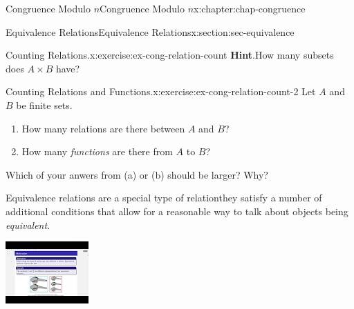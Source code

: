\documentclass[oneside,10pt,]{book}
\newcommand{\blocktitlefont}{\relax}
\numberwithin{equation}{section}
\newlength{\qrsize}
\newlength{\previewwidth}
\begin{document}
\begin{chapterptx}{Congruence Modulo \(n\)}{}{Congruence Modulo \(n\)}{}{}{x:chapter:chap-congruence}
\begin{sectionptx}{Equivalence Relations}{}{Equivalence Relations}{}{}{x:section:sec-equivalence}
\begin{inlineexercise}{Counting Relations.}{x:exercise:ex-cong-relation-count}
\noindent\textbf{\blocktitlefont Hint}.\hypertarget{g:hint:id532434}{}\quad{}How many subsets does \(A \times B\) have?%
\end{inlineexercise}%
\begin{inlineexercise}{Counting Relations and Functions.}{x:exercise:ex-cong-relation-count-2}%
Let \(A\) and \(B\) be finite sets.%
\begin{enumerate}[label=(\alph*)]
\item{}How many relations are there between \(A\) and \(B\)?%
\item{}How many \emph{functions} are there from \(A\) to \(B\)?%
\end{enumerate}
Which of your anwers from (a) or (b) should be larger? Why?%
\end{inlineexercise}%
Equivalence relations are a special type of relation\textemdash{}they satisfy a number of additional conditions that allow for a reasonable way to talk about objects being \emph{equivalent}.%
\begin{sidebyside}{1}{0}{0}{0}%
\begin{sbspanel}{1}%
\setlength{\qrsize}{9em}
\setlength{\previewwidth}{\linewidth}
\addtolength{\previewwidth}{-\qrsize}
\begin{tcbraster}[raster columns=2, raster column skip=1pt, raster halign=center, raster force size=false, raster left skip=0pt, raster right skip=0pt]%
\begin{tcolorbox}[previewstyle, width=\previewwidth]%
\includegraphics[width=0.80\linewidth,height=\qrsize,keepaspectratio]{images/video-equivalence-relation-1.jpg}%
\end{tcolorbox}%
\begin{tcolorbox}[qrstyle]%
{\hypersetup{urlcolor=black}}%

\end{tcolorbox}
\end{tcbraster}
\end{sbspanel}
\end{sidebyside}
\end{sectionptx}
\end{chapterptx}
\end{document}
